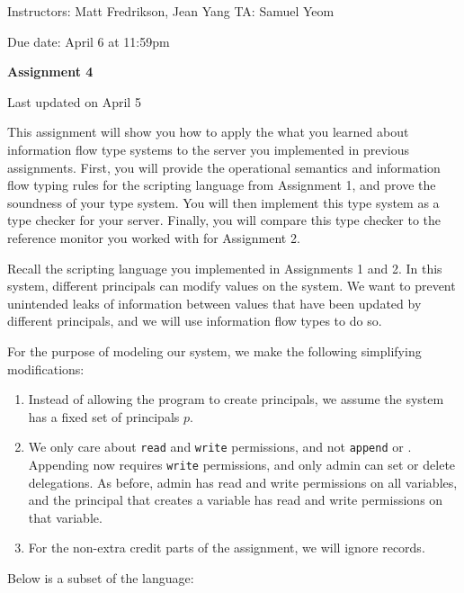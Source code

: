 \documentclass[11pt]{article}
\newcommand*{\stuname}{}
\newcommand*{\assignmentnumb}{4}
\begin{document}
\centerline{Instructors: Matt Fredrikson, Jean Yang \hfill TA: Samuel Yeom} 
\vspace{0.5ex}
Due date: April 6 at 11:59pm \\
\vspace{1.5ex}
\centerline{\Large\bf Assignment \assignmentnumb}
\vspace{0.5ex}
\centerline{\Large\bf \stuname}
\parbox{\textwidth}{\hfill \color{red} Last updated on April 5}

This assignment will show you how to apply the what you learned about information flow type systems to the server you implemented in previous assignments. First, you will provide the operational semantics and information flow typing rules for the scripting language from Assignment 1, and prove the soundness of your type system. You will then implement this type system as a type checker for your server. Finally, you will compare this type checker to the reference monitor you worked with for Assignment 2.

Recall the scripting language you implemented in Assignments 1 and 2. In this system, different principals can modify values on the system. We want to prevent unintended leaks of information between values that have been updated by different principals, and we will use information flow types to do so.

For the purpose of modeling our system, we make the following simplifying modifications:
\begin{enumerate}
\item Instead of allowing the program to create principals, we assume the system has a fixed set of principals $p$.
\item We only care about \texttt{read} and \texttt{write} permissions, and not \texttt{append} or . Appending now requires \texttt{write} permissions, and only admin can set or delete delegations. As before, admin has read and write permissions on all variables, and the principal that creates a variable has read and write permissions on that variable.
\item For the non-extra credit parts of the assignment, we will ignore records.
\end{enumerate}
Below is a subset of the language:
\end{document}
